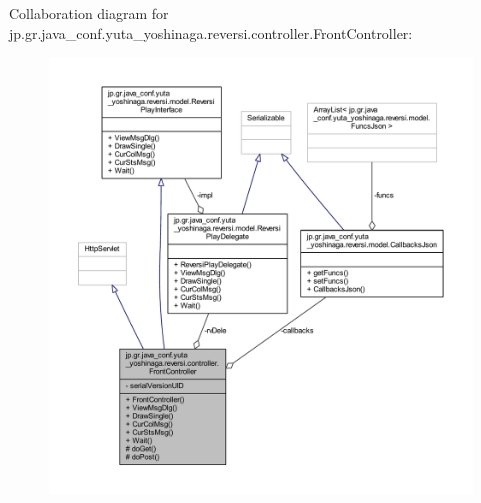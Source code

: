Collaboration diagram for jp.\+gr.\+java\+\_\+conf.\+yuta\+\_\+yoshinaga.\+reversi.\+controller.\+Front\+Controller\+:
\nopagebreak
\begin{figure}[H]
\begin{center}
\leavevmode
\includegraphics[width=350pt]{classjp_1_1gr_1_1java__conf_1_1yuta__yoshinaga_1_1reversi_1_1controller_1_1_front_controller__coll__graph}
\end{center}
\end{figure}
